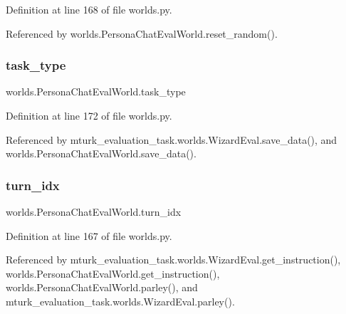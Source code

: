 Definition at line 168 of file worlds.\+py.



Referenced by worlds.\+Persona\+Chat\+Eval\+World.\+reset\+\_\+random().

\mbox{\label{classworlds_1_1PersonaChatEvalWorld_ae6ff8356980eeee972a844a5bdc2b08b}} 
\subsubsection{\texorpdfstring{task\+\_\+type}{task\_type}}
{\footnotesize\ttfamily worlds.\+Persona\+Chat\+Eval\+World.\+task\+\_\+type}



Definition at line 172 of file worlds.\+py.



Referenced by mturk\+\_\+evaluation\+\_\+task.\+worlds.\+Wizard\+Eval.\+save\+\_\+data(), and worlds.\+Persona\+Chat\+Eval\+World.\+save\+\_\+data().

\mbox{\label{classworlds_1_1PersonaChatEvalWorld_acba8e89cca190d9a53656d10087e818a}} 
\subsubsection{\texorpdfstring{turn\+\_\+idx}{turn\_idx}}
{\footnotesize\ttfamily worlds.\+Persona\+Chat\+Eval\+World.\+turn\+\_\+idx}



Definition at line 167 of file worlds.\+py.



Referenced by mturk\+\_\+evaluation\+\_\+task.\+worlds.\+Wizard\+Eval.\+get\+\_\+instruction(), worlds.\+Persona\+Chat\+Eval\+World.\+get\+\_\+instruction(), worlds.\+Persona\+Chat\+Eval\+World.\+parley(), and mturk\+\_\+evaluation\+\_\+task.\+worlds.\+Wizard\+Eval.\+parley().

\mbox{\label{classworlds_1_1PersonaChatEvalWorld_ae597e51544be2476539c075e6ea0bcad}} 
